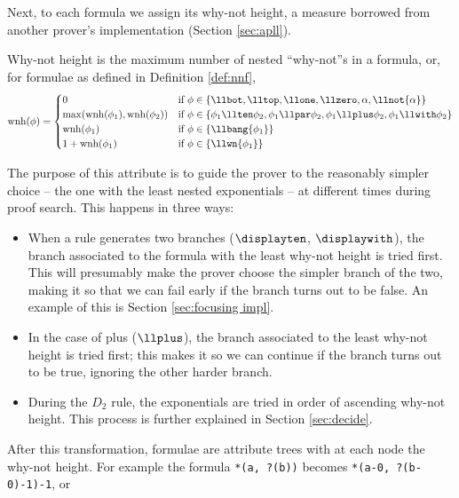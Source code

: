 Next, to each formula we assign its why-not height, a measure borrowed from another prover's implementation (Section \ref{sec:apll}).
\begin{define}
	\label{def:why-not height}
	Why-not height is the maximum number of nested ``why-not''s in a formula, or, for formulae as defined in Definition \ref{def:nnf},
	$$ \mathrm{wnh}(\phi) = 
	\begin{cases}	
		0 & \text{if }\phi \in \{\llbot, \lltop, \llone, \llzero, \alpha, \llnot{\alpha} \} \\
		\max(\mathrm{wnh}(\phi_1), \mathrm{wnh}(\phi_2)) & \text{if } \phi \in \{ \phi_1 \llten \phi_2, \phi_1 \llpar \phi_2, \phi_1 \llplus \phi_2, \phi_1 \llwith \phi_2 \} \\
		\mathrm{wnh}(\phi_1) & \text{if }\phi \in \{ \llbang{\phi_1}\} \\
		1 + \mathrm{wnh}(\phi_1) & \text{if }\phi \in \{ \llwn{\phi_1} \} 
	\end{cases}
	$$
\end{define}
The purpose of this attribute is to guide the prover to the reasonably simpler choice -- the one with the least nested exponentials -- at different times during proof search.
This happens in three ways: 
\begin{itemize}
	\item When a rule generates two branches ($\displayten$, $\displaywith$), the branch associated to the formula with the least why-not height is tried first.
		This will presumably make the prover choose the simpler branch of the two, making it so that we can fail early if the branch turns out to be false.
		An example of this is Section \ref{sec:focusing impl}.
	\item In the case of plus ($\llplus$), the branch associated to the least why-not height is tried first; this makes it so we can continue if the branch turns out to be true, ignoring the other harder branch.
	\item During the $D_2$ rule, the exponentials are tried in order of ascending why-not height.
		This process is further explained in Section \ref{sec:decide}.
\end{itemize}
After this transformation, formulae are attribute trees with at each node the why-not height.
For example the formula \texttt{*(a, ?(b))} becomes \texttt{*(a-0, ?(b-0)-1)-1}, or
\begin{figure}[H]
	\centering
\end{figure}

